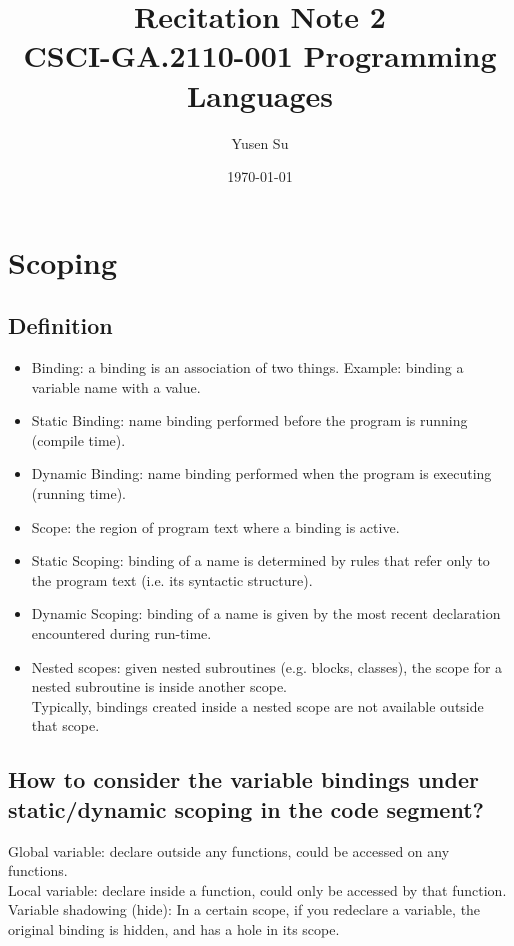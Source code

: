 \documentclass[11pt]{article}
\title{%
  Recitation Note 2 \\
  \large CSCI-GA.2110-001 Programming Languages}
\date{\today}
\author{Yusen Su}
\begin{document}
\maketitle
\section{Scoping}
\subsection{Definition}
\begin{itemize}
\item Binding: a binding is an association of two things. Example: binding a variable name with a value.
\item Static Binding: name binding performed before the program is running (compile time).
\item Dynamic Binding: name binding performed when the program is executing (running time).
\item Scope: the region of program text where a binding is active.
\item Static Scoping: binding of a name is determined by rules that refer only to the program text (i.e. its syntactic structure).
\item Dynamic Scoping: binding of a name is given by the most recent declaration encountered during run-time.
\item Nested scopes:  given nested subroutines (e.g. blocks, classes), the scope for a nested subroutine is inside another scope.  \\
Typically, bindings created inside a nested scope are not available outside that scope.

\end{itemize}
\subsection{How to consider the variable bindings under static/dynamic scoping in the code segment?}
Global variable: declare outside any functions, could be accessed on any functions.\\
Local variable: declare inside a function, could only be accessed by that function.\\
Variable shadowing (hide): In a certain scope, if you redeclare a variable, the original binding is hidden, and has a hole in its scope.\\
\iffalse
\begin{itemize}
\item Static Scoping: depends on the code structure. The variable is bound by a tree data structure. The nearest variable declaration of that variable in the code hierarchy (same level or upper levels).
\item Dynamic Scoping: depends on the execution order. The variable is bound by a stack data structure. The nearest variable declaration of that variable in the running order hierarchy (same level or upper level)
\end{itemize}
\fi
\end{document}

